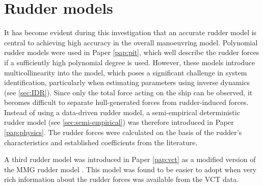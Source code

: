 \section{Rudder models} \label{sec:rudders}
It has become evident during this investigation that an accurate rudder model is central to achieving high accuracy in the overall manoeuvring model. Polynomial rudder models were used in Paper \ref{pap:pit}, which well describe the rudder forces if a sufficiently high polynomial degree is used. However, these models introduce multicollinearity into the model, which poses a significant challenge in system identification, particularly when estimating parameters using inverse dynamics  (see \autoref{sec:IDR}). Since only the total force acting on the ship can be observed, it becomes difficult to separate hull-generated forces from rudder-induced forces. Instead of using a data-driven rudder model, a semi-empirical deterministic rudder model (see \autoref{sec:semi-empirical}) was therefore introduced in Paper \ref{pap:physics}. The rudder forces were calculated on the basis of the rudder's characteristics and established coefficients from the literature.

A third rudder model was introduced in Paper \ref{pap:vct} as a modified version of the MMG rudder model \cite{yasukawaIntroductionMMGStandard2015}. This model was found to be easier to adopt when very rich information about the rudder forces was available from the VCT data.


